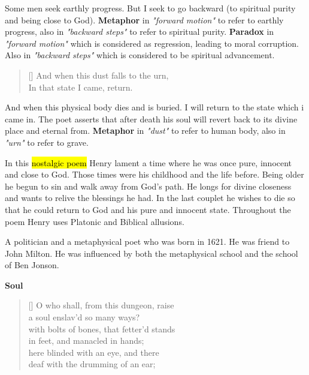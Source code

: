 Some men seek earthly progress. But I seek to go backward (to spiritual purity
and being close to God). \textbf{Metaphor} in \textit{"forward motion"} 
to refer to earthly progress, also in \textit{"backward steps"} to refer 
to spiritual purity. \textbf{Paradox} in 
\textit{"forward motion"} which is considered as regression, leading to moral corruption. Also
in \textit{"backward steps"} which is considered to be spiritual advancement.

\begin{verse}[\versewidth]
{\fontverse
And when this dust falls to the urn,\\
In that state I came, return.
} 
\end{verse}

And when this physical body dies and is buried. I will return to the state 
which i came in. The poet asserts that after death his soul will revert back
to its divine place and eternal from. \textbf{Metaphor} in \textit{"dust"} 
to refer to human body, also in \textit{"urn"} to refer to grave. 


In this \hl{nostalgic poem} Henry lament a time where he was once pure, innocent and close to God.
Those times were his childhood and the life before. Being older he begun to sin
and walk away from God's path. He longs for divine closeness and wants to relive the blessings he had.
In the last couplet he wishes to die so that  he could return to God and his
pure and innocent state. Throughout the poem Henry uses Platonic and Biblical allusions.


A politician and a metaphysical poet who was born in 1621. He was 
friend to John Milton. He was influenced by both the 
metaphysical school and the school of Ben Jonson.

\settowidth{\versewidth}{O who shall, from this dungeon, raise }
\centerline{\textbf{\large{Soul}}}
\begin{verse}[\versewidth]
{\fontverse
O who shall, from this dungeon, raise\\
a soul enslav’d so many ways?\\
with bolts of bones, that fetter’d stands\\
in feet, and manacled in hands;\\
here blinded with an eye, and there\\
deaf with the drumming of an ear;
} 
\end{verse}

